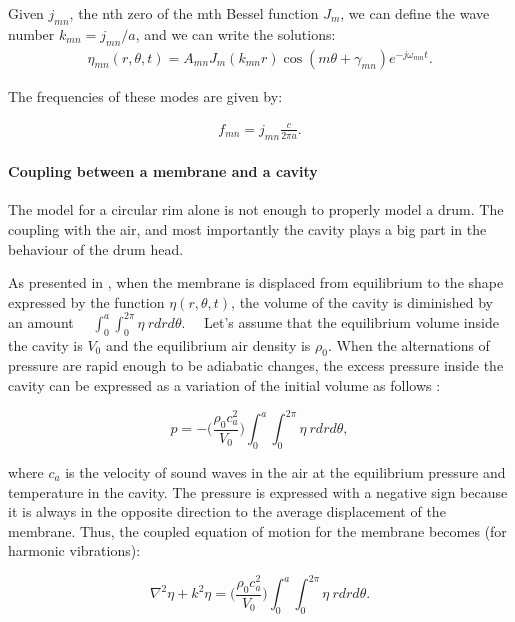 \documentclass[11pt, twocolumn]{article}
\begin{document}
Given $j_{mn}$, the nth zero of the mth Bessel function $J_m$, we can define the wave number $k_{mn} = j_{mn}/a$, and we can write the solutions:
\begin{align}
\eta_{mn}(r, \theta, t) = A_{mn}J_m(k_{mn}r)\cos(m\theta + \gamma_{mn})e^{-j\omega_{mn} t}.
\label{displacement_memb_vide}
\end{align}

The frequencies of these modes are given by:

\begin{align}
f_{mn} = j_{mn}\frac{c}{2\pi a}.
\label{freq_propre_memb_vide}
\end{align}

\paragraph{Coupling between a membrane and a cavity}
\label{acoucoupling}

The model for a circular rim alone is not enough to properly model a drum. The coupling with the air, and most importantly the cavity plays a big part in the behaviour of the drum head. 

As presented in \cite{morse1995vibration}, when the membrane is displaced from equilibrium to the shape expressed by the function $\eta(r, \theta ,t)$, the volume of the cavity is diminished by an amount ~~$\int^{a}_{0}\int^{2\pi}_{0} \eta \: r drd\theta$.~~ Let's assume that the equilibrium volume inside the cavity is $V_0$ and the equilibrium air density is $\rho_0$. When the alternations of pressure are rapid enough to be adiabatic changes, the excess pressure inside the cavity can be expressed as a variation of the initial volume as follows : 

\begin{equation}
    p = - \Bigg(\frac{\rho_0c_a^2}{V_0}\Bigg)\int^{a}_{0}\int^{2\pi}_{0} \eta \: rdrd\theta,
    \label{pression_supp_var_vol}
\end{equation}

where $c_a$ is the velocity of sound waves in the air at the equilibrium pressure and temperature in the cavity. The pressure is expressed with a negative sign because it is always in the opposite direction to the average displacement of the membrane. Thus, the coupled equation of motion for the membrane becomes (for harmonic vibrations):

\begin{equation}
    \nabla^2\eta +k^2\eta = \Bigg(\frac{\rho_0c_a^2}{V_0}\Bigg)\int^{a}_{0}\int^{2\pi}_{0} \eta \: rdrd\theta.
    \label{eqrefmemb}
\end{equation}
\end{document}
